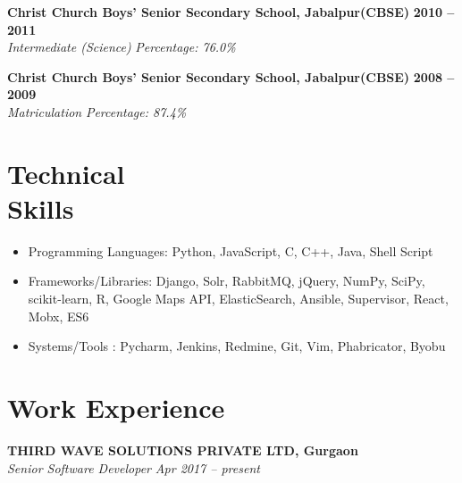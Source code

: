 \documentclass[margin,line]{resume}
\begin{document}
\begin{resume}
    \textbf{Christ Church Boys' Senior Secondary School, Jabalpur(CBSE)} \hfill \textbf{2010 -- 2011}\vspace{0mm}\\\vspace{0mm}%
    \textsl{Intermediate (Science)} \hfill \textsl{Percentage: 76.0\%}

    \textbf{Christ Church Boys' Senior Secondary School, Jabalpur(CBSE)} \hfill \textbf{2008 -- 2009}\vspace{0mm}\\\vspace{0mm}%
    \textsl{Matriculation } \hfill \textsl{Percentage: 87.4\%}
    \section{\mysidestyle Technical \\ Skills}
	\vspace{0mm}
     \begin{itemize}
      \item Programming Languages: Python, JavaScript, C, C++, Java, Shell Script
      \item Frameworks/Libraries: Django, Solr, RabbitMQ, jQuery, NumPy, SciPy, scikit-learn, R, Google Maps API, ElasticSearch, Ansible, Supervisor, React, Mobx, ES6
      \item Systems/Tools : Pycharm, Jenkins, Redmine, Git, Vim, Phabricator, Byobu
     \end{itemize}
    \section{\mysidestyle Work Experience}


    \textbf{THIRD WAVE SOLUTIONS PRIVATE LTD, Gurgaon}\\
           \textsl{Senior Software Developer} \hfill \textsl{Apr 2017 -- present} \vspace{0mm}\\\vspace{0mm}%
    \begin{itemize}


\end{itemize}
\end{resume}
\end{document}
